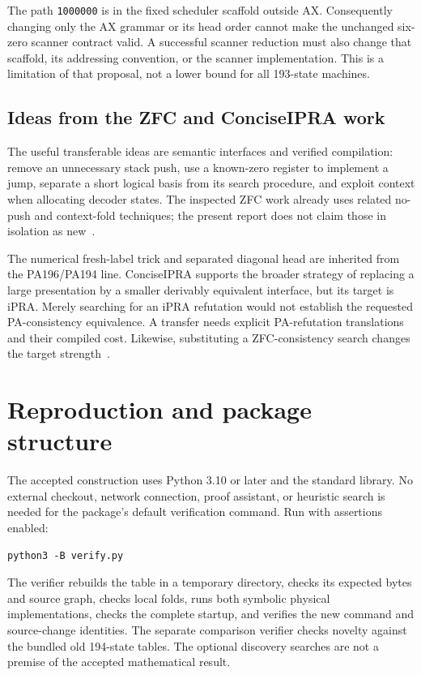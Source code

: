 \documentclass[11pt,letterpaper]{article}
\begin{document}
The path \texttt{1000000} is in the fixed scheduler scaffold outside AX.
Consequently changing only the AX grammar or its head order cannot make the
unchanged six-zero scanner contract valid. A successful scanner reduction
must also change that scaffold, its addressing convention, or the scanner
implementation. This is a limitation of that proposal, not a lower bound
for all 193-state machines.



\subsection{Ideas from the ZFC and ConciseIPRA work}

The useful transferable ideas are semantic interfaces and verified compilation:
remove an unnecessary stack push, use a known-zero register to implement a
jump, separate a short logical basis from its search procedure, and exploit
context when allocating decoder states. The inspected ZFC work already uses
related no-push and context-fold techniques; the present report does not
claim those in isolation as new~\cite{zfc}.

The numerical fresh-label trick and separated diagonal head are inherited
from the PA196/PA194 line. ConciseIPRA supports the broader strategy of
replacing a large presentation by a smaller derivably equivalent interface,
but its target is iPRA. Merely searching for an iPRA refutation would not
establish the requested PA-consistency equivalence. A transfer needs explicit
PA-refutation translations and their compiled cost. Likewise, substituting
a ZFC-consistency search changes the target strength~\cite{concise}.

\section{Reproduction and package structure}

The accepted construction uses Python 3.10 or later and the standard library.
No external checkout, network connection, proof assistant, or heuristic search
is needed for the package's default verification command. Run with assertions
enabled:
\begin{verbatim}
python3 -B verify.py
\end{verbatim}
The verifier rebuilds the table in a temporary directory, checks its expected
bytes and source graph, checks local folds, runs both symbolic physical
implementations, checks the complete startup, and verifies the new command
and source-change identities. The separate comparison verifier checks novelty
against the bundled old 194-state tables. The optional discovery searches are
not a premise of the accepted mathematical result.
\end{document}
